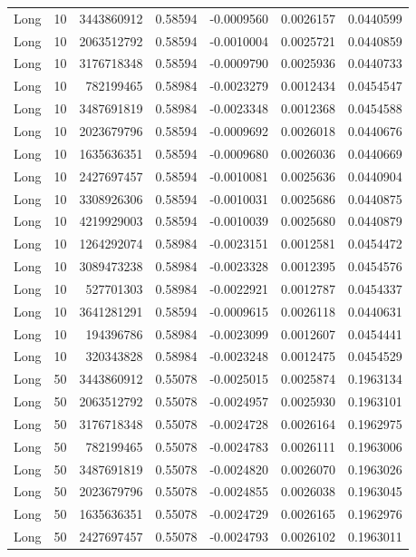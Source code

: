 \begin{longtable}{llrrrrr}
Long & 10 & 3443860912 & 0.58594 & -0.0009560 & 0.0026157 & 0.0440599 \\
Long & 10 & 2063512792 & 0.58594 & -0.0010004 & 0.0025721 & 0.0440859 \\
Long & 10 & 3176718348 & 0.58594 & -0.0009790 & 0.0025936 & 0.0440733 \\
Long & 10 & 782199465 & 0.58984 & -0.0023279 & 0.0012434 & 0.0454547 \\
Long & 10 & 3487691819 & 0.58984 & -0.0023348 & 0.0012368 & 0.0454588 \\
Long & 10 & 2023679796 & 0.58594 & -0.0009692 & 0.0026018 & 0.0440676 \\
Long & 10 & 1635636351 & 0.58594 & -0.0009680 & 0.0026036 & 0.0440669 \\
Long & 10 & 2427697457 & 0.58594 & -0.0010081 & 0.0025636 & 0.0440904 \\
Long & 10 & 3308926306 & 0.58594 & -0.0010031 & 0.0025686 & 0.0440875 \\
Long & 10 & 4219929003 & 0.58594 & -0.0010039 & 0.0025680 & 0.0440879 \\
Long & 10 & 1264292074 & 0.58984 & -0.0023151 & 0.0012581 & 0.0454472 \\
Long & 10 & 3089473238 & 0.58984 & -0.0023328 & 0.0012395 & 0.0454576 \\
Long & 10 & 527701303 & 0.58984 & -0.0022921 & 0.0012787 & 0.0454337 \\
Long & 10 & 3641281291 & 0.58594 & -0.0009615 & 0.0026118 & 0.0440631 \\
Long & 10 & 194396786 & 0.58984 & -0.0023099 & 0.0012607 & 0.0454441 \\
Long & 10 & 320343828 & 0.58984 & -0.0023248 & 0.0012475 & 0.0454529 \\
Long & 50 & 3443860912 & 0.55078 & -0.0025015 & 0.0025874 & 0.1963134 \\
Long & 50 & 2063512792 & 0.55078 & -0.0024957 & 0.0025930 & 0.1963101 \\
Long & 50 & 3176718348 & 0.55078 & -0.0024728 & 0.0026164 & 0.1962975 \\
Long & 50 & 782199465 & 0.55078 & -0.0024783 & 0.0026111 & 0.1963006 \\
Long & 50 & 3487691819 & 0.55078 & -0.0024820 & 0.0026070 & 0.1963026 \\
Long & 50 & 2023679796 & 0.55078 & -0.0024855 & 0.0026038 & 0.1963045 \\
Long & 50 & 1635636351 & 0.55078 & -0.0024729 & 0.0026165 & 0.1962976 \\
Long & 50 & 2427697457 & 0.55078 & -0.0024793 & 0.0026102 & 0.1963011 \\

\end{longtable}

